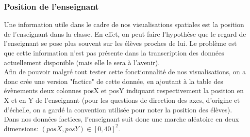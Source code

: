 \documentclass{article}
\begin{document}
\subsubsection{Position de l'enseignant}
Une information utile dans le cadre de nos visualisations spatiales est la position de l'enseignant dans la classe. En effet, on peut faire l'hypothèse que le regard de l'enseignant se pose plus souvent sur les élèves proches de lui. Le problème est que cette information n'est pas présente dans la transcription des données actuellement disponible (mais elle le sera à l'avenir).\\
Afin de pouvoir malgré tout tester cette fonctionnalité de nos visualisations, on a donc crée une version "factice" de cette donnée, en ajoutant à la table des évènements deux colonnes posX et posY indiquant respectivement la position en X et en Y de l'enseignant (pour les questions de direction des axes, d'origine et d'échelle, on a gardé la convention utilisée pour noter la position des élèves). Dans nos données factices, l'enseignant suit donc une marche aléatoire en deux dimensions: $(posX, posY) \in [0, 40]^2$.
\end{document}
